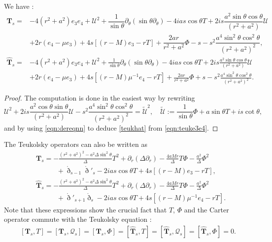 \documentclass[reqno]{amsart}
\numberwithin{equation}{section}
\newcommand{\teukhat}{\widehat{\teuk}}
\newcommand{\mcq}{\mathcal{Q}}
\newcommand{\mcu}{\mathcal{U}}
\newcommand{\drond}{\mathring{\eth}}
\newcommand{\teuk}{\mathbf{T}}
\theoremstyle{plain}
\theoremstyle{definition}
\theoremstyle{remark}
\numberwithin{equation}{section}
\begin{document}
\begin{prop}\label{prop:}
We have :
    \begin{align}\label{eqn:teuke3e4}
    \teuk_s=&-4(r^2+a^2)e_3e_4+ \mcu^2+\dfrac{1}{\sin\theta}\partial_\theta(\sin\theta\partial_\theta)-4 ias\cos\theta T+2is\dfrac{a^2\sin\theta\cos\theta}{(r^2+a^2)}\mcu\nonumber\\
    &+2 r (e_4-\mu e_3)+4 s[(r-M)e_3- rT]+\dfrac{2ar }{r^2+a^2}\Phi- s-s^2\dfrac{a^4\sin^2\theta\cos^2\theta}{(r^2+a^2)^2},
\end{align}
    \begin{align}\label{teukhat}
    \teukhat_s=&-4(r^2+a^2)e_3e_4+ \mcu^2+\frac{1}{\sin\theta}\partial_\theta(\sin\theta\partial_\theta)-4 ias\cos\theta T+2is\frac{a^2\sin\theta\cos\theta}{(r^2+a^2)}\mcu\nonumber\\
    &+2 r (e_4-\mu e_3)+4 s[(r-M)\mu^{-1}e_4- rT]+\frac{2ar }{r^2+a^2}\Phi+ s-s^2\frac{a^4\sin^2\theta\cos^2\theta}{(r^2+a^2)^2}.
\end{align}
\end{prop}
\begin{proof}
    The computation is done in the easiest way by rewriting
    $$\mcu^2+2is\frac{a^2\cos\theta\sin\theta}{(r^2+a^2)}\mcu-s^2\frac{a^4\sin^2\theta\cos^2\theta}{(r^2+a^2)^2}=\widetilde{\mcu}^2,\quad\widetilde{\mcu}:=\frac{1}{\sin\theta}\Phi+a\sin\theta T+is\cot\theta,$$
    and by using \eqref{eqn:dereqnn} to deduce \eqref{teukhat} from \eqref{eqn:teuke3e4}.
\end{proof}
The Teukolsky operators can also be written \cite[(3.3)]{pricelaw} as
\begin{align}
    &\teuk_s=-\frac{(r^2+a^2)^2-a^2\Delta\sin^2\theta}{\Delta}T^2+\partial_r(\Delta\partial_r)-\frac{4aMr}{\Delta}T\Phi-\frac{a^2}{\Delta}\Phi^2\nonumber\\
    &\quad\quad\quad+\drond_{s-1}\drond'_s-2ias\cos\theta T+4s[(r-M)e_3-rT],\label{eqn:opteuk}\\
    &\teukhat_s=-\frac{(r^2+a^2)^2-a^2\Delta\sin^2\theta}{\Delta}T^2+\partial_r(\Delta\partial_r)-\frac{4aMr}{\Delta}T\Phi-\frac{a^2}{\Delta}\Phi^2\nonumber\\
    &\quad\quad\quad+\drond'_{s+1}\drond_s-2ias\cos\theta T+4s[(r-M)\mu^{-1}e_4-rT].\label{eqn:opteukhat}
\end{align}
Note that these expressions show the crucial fact that $T$, $\Phi$ and the Carter operator commute with the Teukolsky equation :
\begin{align}\label{eqn:commutateurs}
    [\teuk_s,T]=[\teuk_s,\mcq_s]=[\teuk_s,\Phi]=[\teukhat_s,T]=[\teukhat_s,\mcq_s]=[\teukhat_s,\Phi]=0.
\end{align}
\end{document}
